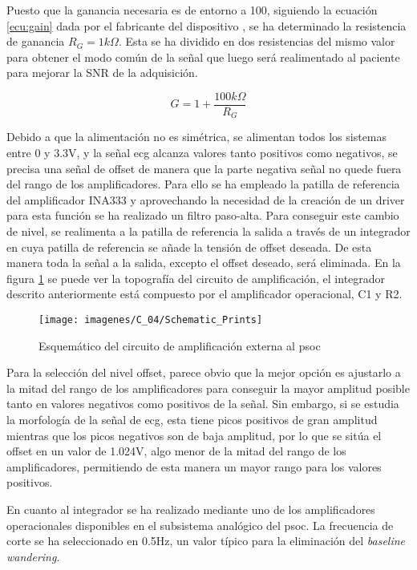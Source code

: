 Puesto que la ganancia necesaria es de entorno a 100, siguiendo la ecuación \ref{ecu:gain} dada por el fabricante del dispositivo \cite{INA333}, se ha determinado la resistencia de ganancia  $R_G=1 k\Omega$. Esta se ha dividido en dos resistencias del mismo valor para obtener el modo común de la señal que luego será realimentado al paciente para mejorar la SNR de la adquisición.

\begin{equation}\label{ecu:gain}
G=1+\frac{100 k\Omega}{R_G}
\end{equation}

Debido a que la alimentación no es simétrica, se alimentan todos los sistemas entre 0 y 3.3V, y la señal \acrshort{ecg} alcanza valores tanto positivos como negativos, se precisa una señal de offset de manera que la parte negativa señal no quede fuera del rango de los amplificadores. Para ello se ha empleado la patilla de referencia del amplificador INA333 y aprovechando la necesidad de la creación de un driver para esta función se ha realizado un filtro paso-alta. Para conseguir este cambio de nivel, se realimenta a la patilla de referencia la salida a través de un integrador en cuya patilla de referencia se añade la tensión de offset deseada. De esta manera toda la señal a la salida, excepto el offset deseado, será eliminada. En la figura \ref{fig:Preamp} se puede ver la topografía del circuito de amplificación, el integrador descrito anteriormente está compuesto por el amplificador operacional, C1 y R2.

\begin{figure}[!ht]
	\center
	\texttt{[image: imagenes/C\_04/Schematic\_Prints]}
	\caption{Esquemático del circuito de amplificación externa al \acrshort{psoc}}
	\label{fig:Preamp}
\end{figure}

Para la selección del nivel offset, parece obvio que la mejor opción es ajustarlo a la mitad del rango de los amplificadores para conseguir la mayor amplitud posible tanto en valores negativos como positivos de la señal. Sin embargo, si se estudia la morfología de la señal de  \acrshort{ecg}, esta tiene picos positivos de gran amplitud mientras que los picos negativos son de baja amplitud, por lo que se sitúa el offset en un valor de 1.024V, algo menor de la mitad del rango de los amplificadores, permitiendo de esta manera un mayor rango para los valores positivos.

En cuanto al integrador se ha realizado mediante uno de los amplificadores operacionales disponibles en el subsistema analógico del \acrshort{psoc}. La frecuencia de corte se ha seleccionado en 0.5Hz, un valor típico para la eliminación del \textit{baseline wandering}. 

